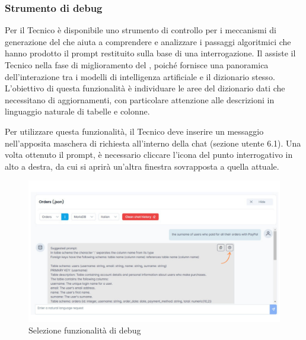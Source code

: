 \subsubsection{Strumento di debug}

\par Per il Tecnico è disponibile uno strumento di controllo per i meccanismi di generazione del  che aiuta a comprendere e analizzare i passaggi algoritmici che hanno prodotto il prompt restituito sulla base di una interrogazione. Il  assiste il Tecnico nella fase di miglioramento del , poiché fornisce una panoramica dell'interazione tra i modelli di intelligenza artificiale e il dizionario stesso. L'obiettivo di questa funzionalità è individuare le aree del dizionario dati che necessitano di aggiornamenti, con particolare attenzione alle descrizioni in linguaggio naturale di tabelle e colonne.

\par Per utilizzare questa funzionalità, il Tecnico deve inserire un messaggio nell'apposita maschera di richiesta all'interno della chat (sezione utente 6.1). Una volta ottenuto il prompt, è necessario cliccare l'icona del punto interrogativo in alto a destra, da cui si aprirà un'altra finestra sovrapposta a quella attuale.

\begin{figure}[H]
  \centering
  \includegraphics[width=\textwidth]{assets/tasto_info_debug.png}
  \caption{Selezione funzionalità di debug}
\end{figure}

